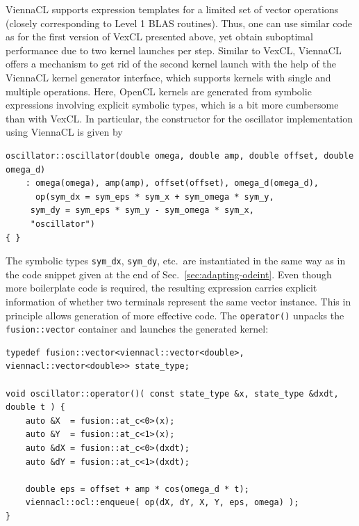 \documentclass[final]{siamltex}
\newcommand{\code}[1]{\lstinline|#1|}
\begin{document}
ViennaCL supports expression templates for a limited set of    %
vector operations (closely corresponding to Level 1 BLAS routines).
Thus, one can use similar code as for the first version of VexCL presented above,
yet obtain suboptimal performance due to two kernel launches per step.
Similar to VexCL, ViennaCL offers a mechanism to get rid of the second kernel launch
with the help of the ViennaCL kernel generator interface, which supports kernels with single and multiple operations.
Here, OpenCL kernels are generated from symbolic expressions involving explicit symbolic types,
which is a bit more cumbersome than with VexCL. In particular, the constructor
for the oscillator implementation using ViennaCL is given by
%
%
%
\begin{lstlisting}
oscillator::oscillator(double omega, double amp, double offset, double omega_d)
    : omega(omega), amp(amp), offset(offset), omega_d(omega_d),
      op(sym_dx = sym_eps * sym_x + sym_omega * sym_y,
	 sym_dy = sym_eps * sym_y - sym_omega * sym_x,
	 "oscillator")
{ }
\end{lstlisting}
%
The symbolic types \code{sym_dx}, \code{sym_dy}, etc.~are instantiated in the same way
as in the code snippet given at the end of Sec.~\ref{sec:adapting-odeint}.
Even though more boilerplate code is required, the resulting expression
carries explicit information of whether two terminals represent the same vector
instance. This in principle allows generation of more effective code. The
\code{operator()} unpacks the \code{fusion::vector} container and launches
the generated kernel:
\begin{lstlisting}
typedef fusion::vector<viennacl::vector<double>, viennacl::vector<double>> state_type;

void oscillator::operator()( const state_type &x, state_type &dxdt, double t ) {
    auto &X  = fusion::at_c<0>(x);
    auto &Y  = fusion::at_c<1>(x);
    auto &dX = fusion::at_c<0>(dxdt);
    auto &dY = fusion::at_c<1>(dxdt);

    double eps = offset + amp * cos(omega_d * t);
    viennacl::ocl::enqueue( op(dX, dY, X, Y, eps, omega) );
}
\end{lstlisting}
\end{document}
